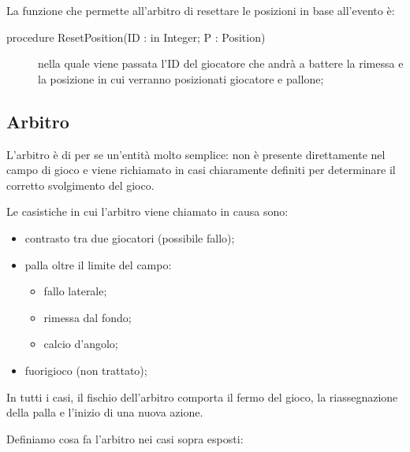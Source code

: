 \documentclass[aps,letterpaper,10pt]{article}
\begin{document}
La funzione che permette all'arbitro di resettare le posizioni in base all'evento \`e:

\begin{description}
	\item[procedure ResetPosition(ID : in Integer; P : Position)] nella quale viene passata l'ID del giocatore che andr\`a a battere la rimessa e la posizione in cui verranno posizionati giocatore e pallone;
\end{description}

\subsection{Arbitro}
\label{arbitro}

L'arbitro \`e di per se un'entit\`a molto semplice: non \`e presente direttamente nel campo di gioco e viene richiamato in casi chiaramente definiti per determinare il corretto svolgimento del gioco. \vspace{3mm}

Le casistiche in cui l'arbitro viene chiamato in causa sono:

\begin{itemize}
	\item contrasto tra due giocatori (possibile fallo);
	\item palla oltre il limite del campo:
	\begin{itemize}
		\item fallo laterale;
		\item rimessa dal fondo;
		\item calcio d'angolo;
	\end{itemize}
	\item fuorigioco (non trattato);
\end{itemize}

In tutti i casi, il fischio dell'arbitro comporta il fermo del gioco, la riassegnazione della palla e l'inizio di una nuova azione. \vspace{3mm}

Definiamo cosa fa l'arbitro nei casi sopra esposti:
\end{document}
